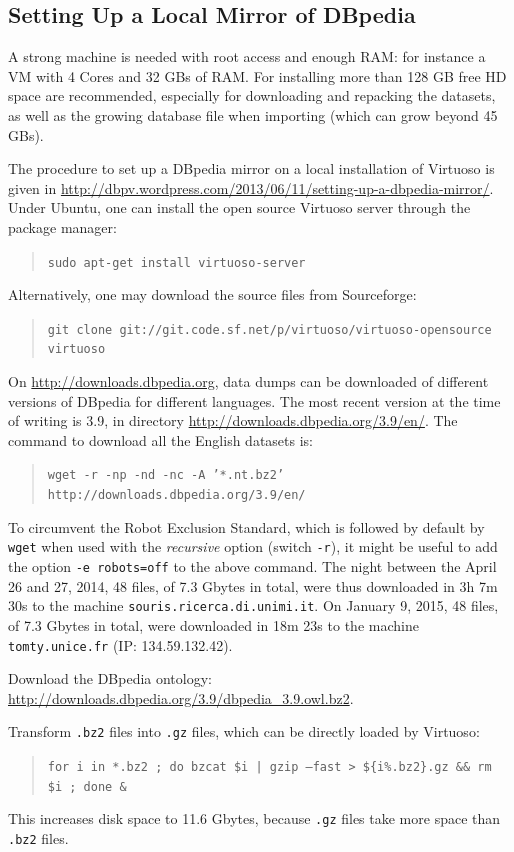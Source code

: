 \documentclass[a4paper]{article}
\newcounter{ex}
\begin{document}
\subsection{Setting Up a Local Mirror of DBpedia}

A strong machine is needed with root access and enough RAM: for instance
a VM with 4 Cores and 32 GBs of RAM. For installing more than 128 GB free HD space
are recommended, especially for downloading and repacking the datasets,
as well as the growing database file when importing (which can grow beyond 45 GBs).

The procedure to set up a DBpedia mirror on a local installation of Virtuoso
is given in \url{http://dbpv.wordpress.com/2013/06/11/setting-up-a-dbpedia-mirror/}.
Under Ubuntu, one can install the open source Virtuoso server through
the package manager:
\begin{quotation}
  \texttt{sudo apt-get install virtuoso-server}
\end{quotation}
Alternatively, one may download the source files from Sourceforge:
\begin{quotation}
  \texttt{git clone git://git.code.sf.net/p/virtuoso/virtuoso-opensource virtuoso}
\end{quotation}

On \url{http://downloads.dbpedia.org}, data dumps can be downloaded of different versions
of DBpedia for different languages. The most recent version at the time of writing
is 3.9, in directory \url{http://downloads.dbpedia.org/3.9/en/}.
The command to download all the English datasets is:
\begin{quotation}
  \texttt{wget -r -np -nd -nc -A '*.nt.bz2' http://downloads.dbpedia.org/3.9/en/}
\end{quotation}
To circumvent the Robot Exclusion Standard, which is followed by default by \texttt{wget}
when used with the \emph{recursive} option (switch \texttt{-r}), it might be useful
to add the option \texttt{-e robots=off} to the above command.
The night between the April 26 and 27, 2014, 48 files, of 7.3 Gbytes in total,
were thus downloaded in 3h 7m 30s to the machine \texttt{souris.ricerca.di.unimi.it}.
On January 9, 2015, 48 files, of 7.3 Gbytes in total, were downloaded in 18m 23s
to the machine \texttt{tomty.unice.fr} (IP: 134.59.132.42).

Download the DBpedia ontology: \url{http://downloads.dbpedia.org/3.9/dbpedia_3.9.owl.bz2}.

Transform \texttt{.bz2} files into \texttt{.gz} files, which can be directly loaded by Virtuoso:
\begin{quotation}
  \texttt{for i in *.bz2 ; do bzcat \$i | gzip --fast > \$\{i\%.bz2\}.gz \&\& rm \$i ; done \&}
\end{quotation}
This increases disk space to 11.6 Gbytes, because \texttt{.gz} files take more space
than \texttt{.bz2} files.
\end{document}
